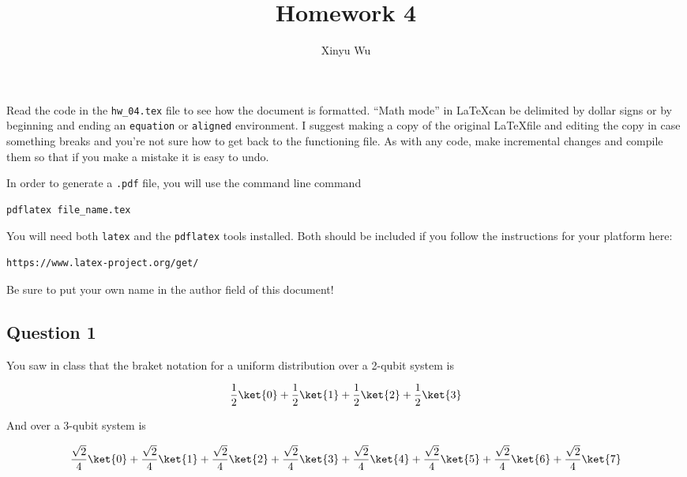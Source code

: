 \documentclass{article}
\title{Homework 4}
\author{Xinyu Wu}
\date{}
\begin{document}
\maketitle %

Read the code in the \texttt{hw\_04.tex} file to see how the document is formatted. ``Math mode'' in \LaTeX  can be delimited by dollar signs or by beginning and ending an \texttt{equation} or \texttt{aligned} environment. I suggest making a copy of the original \LaTeX file and editing the copy in case something breaks and you're not sure how to get back to the functioning file. As with any code, make incremental changes and compile them so that if you make a mistake it is easy to undo.

In order to generate a \texttt{.pdf} file, you will use the command line command

\begin{verbatim}
pdflatex file_name.tex
\end{verbatim}

You will need both \texttt{latex} and the \texttt{pdflatex} tools installed. Both should be included if you follow the instructions for your platform here:

\begin{verbatim}
https://www.latex-project.org/get/
\end{verbatim}

Be sure to put your own name in the author field of this document!


\subsection*{Question 1}

You saw in class that the braket notation for a uniform distribution over a 2-qubit system is

\begin{equation*}
    \frac{1}{2}\ket{0} + \frac{1}{2}\ket{1} + \frac{1}{2}\ket{2} + \frac{1}{2}\ket{3}
\end{equation*}

And over a 3-qubit system is

\begin{equation*}
    \frac{\sqrt{2}}{4}\ket{0} + \frac{\sqrt{2}}{4}\ket{1} + \frac{\sqrt{2}}{4}\ket{2} + \frac{\sqrt{2}}{4}\ket{3}
    + \frac{\sqrt{2}}{4}\ket{4} + \frac{\sqrt{2}}{4}\ket{5} + \frac{\sqrt{2}}{4}\ket{6} + \frac{\sqrt{2}}{4}\ket{7}
\end{equation*}
\end{document}
